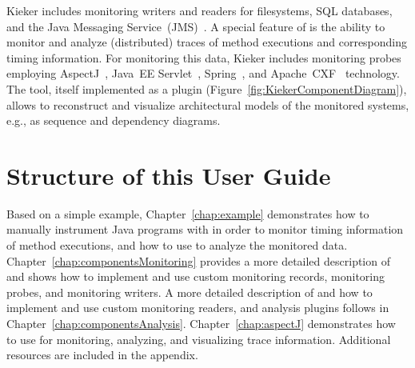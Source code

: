 Kieker includes monitoring writers and readers for filesystems, SQL %
databases, and the Java Messaging Service~(JMS)~\cite{JMS-WebSite}. %
A special feature of \Kieker{} is the ability to monitor and analyze (distributed) %
traces of method executions and corresponding timing information. %
For monitoring this data, Kieker includes monitoring probes employing %
AspectJ~\cite{AspectJ-WebSite}, %
Java~EE Servlet~\cite{JavaServletTechnology-WebSite}, %
Spring~\cite{Spring-WebSite}, and %
Apache~CXF~\cite{CXF-WebSite} technology. %
The \KiekerTraceAnalysis{} tool, itself implemented as a \KiekerAnalysisPart{} %
plugin (Figure~\ref{fig:KiekerComponentDiagram}), allows to reconstruct and visualize architectural models of the monitored %
systems, e.g., as sequence and dependency diagrams.

\pagebreak

\section{Structure of this User Guide}

Based on a simple example, Chapter~\ref{chap:example} demonstrates %
how to manually instrument Java programs with \KiekerMonitoringPart{} %
in order to monitor timing information of method executions, and %
how to use \KiekerAnalysisPart{} to analyze the monitored data. %
Chapter~\ref{chap:componentsMonitoring} provides a more detailed %
description of \KiekerMonitoringPart{} and shows how to implement and %
use custom monitoring records, monitoring probes, and monitoring writers. %
A more detailed description of \KiekerAnalysisPart{} and how to implement and use %
custom monitoring readers, and analysis plugins follows in %
Chapter~\ref{chap:componentsAnalysis}. %
Chapter~\ref{chap:aspectJ} demonstrates how to use \KiekerTraceAnalysis{} %
for monitoring, analyzing, and visualizing trace information. %
Additional resources are included in the appendix.

\quad\\



